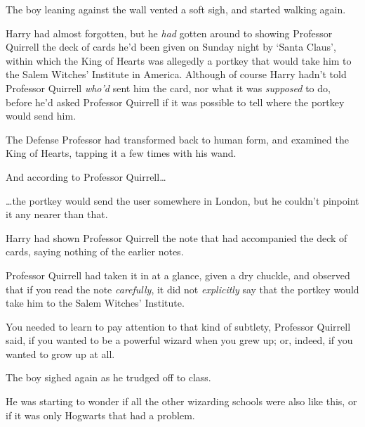 The boy leaning against the wall vented a soft sigh, and started walking again.

Harry had almost forgotten, but he \emph{had} gotten around to showing 
Professor Quirrell the deck of cards he'd been given on Sunday night by `Santa 
Claus', within which the King of Hearts was allegedly a portkey that would take 
him to the Salem Witches' Institute in America. Although of course Harry hadn't 
told Professor Quirrell \emph{who'd} sent him the card, nor what it was 
\emph{supposed} to do, before he'd asked Professor Quirrell if it was possible 
to tell where the portkey would send him.

The Defense Professor had transformed back to human form, and examined the King 
of Hearts, tapping it a few times with his wand.

And according to Professor Quirrell{\ldots}

{\ldots}the portkey would send the user somewhere in London, but he couldn't 
pinpoint it any nearer than that.

Harry had shown Professor Quirrell the note that had accompanied the deck of 
cards, saying nothing of the earlier notes.

Professor Quirrell had taken it in at a glance, given a dry chuckle, and 
observed that if you read the note \emph{carefully}, it did not 
\emph{explicitly} say that the portkey would take him to the Salem Witches' 
Institute.

You needed to learn to pay attention to that kind of subtlety, Professor 
Quirrell said, if you wanted to be a powerful wizard when you grew up; or, 
indeed, if you wanted to grow up at all.

The boy sighed again as he trudged off to class.

He was starting to wonder if all the other wizarding schools were also like 
this, or if it was only Hogwarts that had a problem.
